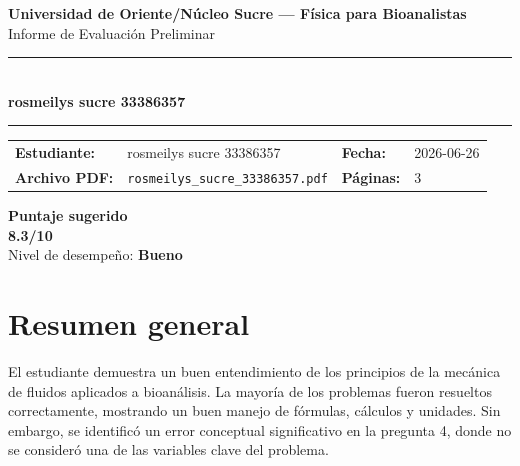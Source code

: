 \documentclass[11pt,a4paper]{article}
\begin{document}
\begin{center}
  {\Large\bfseries\color{azulTitulo} Universidad de Oriente/Núcleo Sucre --- Física para Bioanalistas}\\[4pt]
  {\large Informe de Evaluación Preliminar}\\[12pt]
  \rule{\linewidth}{1.2pt}\\[6pt]
  {\LARGE\bfseries rosmeilys sucre 33386357}\\[4pt]
  \rule{\linewidth}{0.6pt}
\end{center}

\vspace{4pt}
\begin{tcolorbox}[cajaTitulo, title=Datos del informe]
\begin{tabular}{@{}llll@{}}
  \textbf{Estudiante:}  & rosmeilys sucre 33386357  &
  \textbf{Fecha:}       & 2026-06-26 \\[4pt]
  \textbf{Archivo PDF:} & \texttt{rosmeilys\_sucre\_33386357.pdf}  &
  \textbf{Páginas:}     & 3 \\
\end{tabular}
\end{tcolorbox}

\vspace{6pt}
\begin{center}
  \begin{tcolorbox}[
    enhanced,
    colback=white, colframe=desempeno_bueno,
    width=0.62\linewidth,
    boxrule=2pt,
    halign=center, valign=center,
    top=8pt, bottom=8pt,
  ]
    \centering
    {\large\bfseries Puntaje sugerido}\\[6pt]
    {\Huge\bfseries\color{desempeno_bueno} 8.3/10}\\[6pt]
    {\large Nivel de desempeño: \textbf{\color{desempeno_bueno} Bueno}}
  \end{tcolorbox}
\end{center}

\section*{Resumen general}
El estudiante demuestra un buen entendimiento de los principios de la mecánica de fluidos aplicados a bioanálisis. La mayoría de los problemas fueron resueltos correctamente, mostrando un buen manejo de fórmulas, cálculos y unidades. Sin embargo, se identificó un error conceptual significativo en la pregunta 4, donde no se consideró una de las variables clave del problema.
\end{document}
